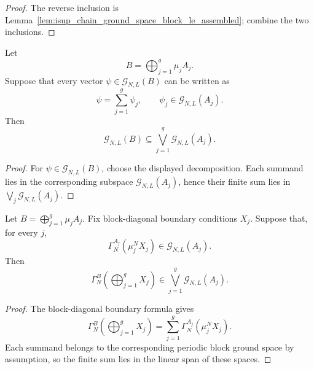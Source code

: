 \begin{proof}
    \leanok
    The reverse inclusion is
    Lemma~\ref{lem:isup_chain_ground_space_block_le_assembled}; combine the two
    inclusions.
\end{proof}

\begin{lemma}
    \label{lem:block_diagonal_boundary_decomposition_inclusion}
    \leanok
    Let
    \[
        B=\bigoplus_{j=1}^g\mu_jA_j.
    \]
    Suppose that every vector $\psi\in\mathcal G_{N,L}(B)$ can be written as
    \[
        \psi=\sum_{j=1}^g\psi_j,
        \qquad
        \psi_j\in\mathcal G_{N,L}(A_j).
    \]
    Then
    \[
        \mathcal G_{N,L}(B)
        \subseteq
        \bigvee_{j=1}^g\mathcal G_{N,L}(A_j).
    \]
\end{lemma}

\begin{proof}
    \leanok
    For $\psi\in\mathcal G_{N,L}(B)$, choose the displayed decomposition. Each
    summand lies in the corresponding subspace
    $\mathcal G_{N,L}(A_j)$, hence their finite sum lies in
    $\bigvee_j\mathcal G_{N,L}(A_j)$.
\end{proof}

\begin{lemma}
    \label{lem:block_diagonal_boundary_vector_mem_chain_sum}
    \leanok
    Let $B=\bigoplus_{j=1}^g\mu_jA_j$. Fix block-diagonal boundary conditions
    $X_j$.
    Suppose that, for every $j$,
    \[
        \Gamma_N^{A_j}(\mu_j^N X_j)\in\mathcal G_{N,L}(A_j).
    \]
    Then
    \[
        \Gamma_N^B\!\left(\bigoplus_{j=1}^gX_j\right)
        \in
        \bigvee_{j=1}^g\mathcal G_{N,L}(A_j).
    \]
\end{lemma}

\begin{proof}
    \leanok
    The block-diagonal boundary formula gives
    \[
        \Gamma_N^B\!\left(\bigoplus_{j=1}^gX_j\right)
        =
        \sum_{j=1}^g\Gamma_N^{A_j}(\mu_j^N X_j).
    \]
    Each summand belongs to the corresponding periodic block ground space by
    assumption, so the finite sum lies in the linear span of these spaces.
\end{proof}

